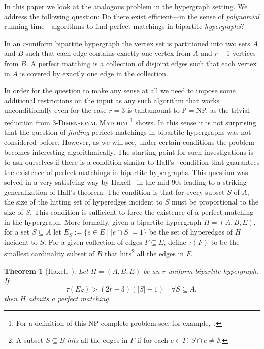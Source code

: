\documentclass[11pt]{article}
\newtheorem{theorem}{Theorem}[section]
\theoremstyle{definition}
\theoremstyle{remark}
\newcommand{\problemmacro}[1]{\texorpdfstring{\textsc{#1}}{#1}\xspace}
\begin{document}
In this paper we look at the analogous problem in the hypergraph
setting. We address the following question: Do there exist
efficient---in the sense of \emph{polynomial} running time---algorithms
to find perfect matchings in bipartite \emph{hypergraphs}?

In an $r$-uniform bipartite hypergraph the vertex set is partitioned
into two sets $A$ and $B$ such that each edge contains exactly one
vertex from $A$ and $r-1$ vertices from $B$. A perfect matching is a
collection of disjoint edges such that each vertex in $A$ is covered
by exactly one edge in the collection.

In order for the question to make any sense at all we need to impose
some additional restrictions on the input as any such algorithm that
works unconditionally even for the case $r=3$ is tantamount to P$=$NP,
as the trivial reduction from \problemmacro{$3$-Dimensional
  Matching}\footnote{For a definition of this NP-complete problem see, for example,~\cite{cygan2013improved}.} shows. In this sense it is not surprising that the question of
\emph{finding} perfect matchings in bipartite hypergraphs was not
considered before. However, as we will see, under certain conditions
the problem becomes interesting algorithmically. The starting point
for such investigations is to ask ourselves if there is a condition
similar to Hall's~\cite{hall1935representatives} condition that
guarantees the existence of perfect matchings in bipartite
hypergraphs. This question was solved in a very satisfying way by
Haxell~\cite{haxell1995condition} in the mid-90s leading to a striking
generalization of Hall's theorem. The condition is that for every
subset $S$ of $A$, the size of the hitting set of hyperedges incident
to $S$ must be proportional to the size of $S$. This condition
is sufficient to force the existence of a perfect matching in the
hypergraph. More formally, given a bipartite hypergraph $H=(A,B,E)$,
for a set $S \subseteq A$ let
$E_S := \{ e\in E \;|\; |e \cap S| = 1\} $ be the set of hyperedges of
$H$ incident to $S$. For a given collection of edges $F \subseteq E$,
define $\tau(F)$ to be the smallest cardinality subset of $B$
that hits\footnote{A subset $S \subseteq B$ \emph{hits} all the edges
  in $F$ if for each $e \in F$, $S \cap e \neq \emptyset$.} all the
edges in $F$.

\begin{theorem}[Haxell~\cite{haxell1995condition}]\label{thm:haxell}
  Let $H = (A,B,E)$ be an $r$-uniform bipartite hypergraph. If
  \[\tau(E_S) > (2r-3)(|S|-1) \quad \forall S \subseteq A,\] then $H$ admits a perfect matching.
\end{theorem}
\end{document}

